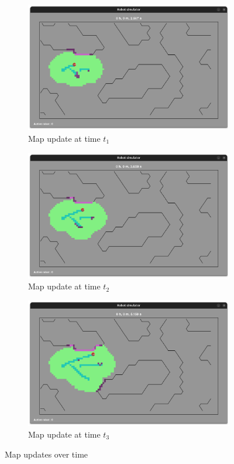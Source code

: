 \documentclass[../main.tex]{subfiles}
\begin{document}
\begin{figure}[H]
	\centering
	\begin{subfigure}{0.4\textwidth}
		\centering
		\includegraphics[width=\textwidth]{IMAGES/part2/lgm_t1.png}
		\caption{Map update at time $t_1$}
	\end{subfigure}
	\hfill
	\begin{subfigure}{0.4\textwidth}
		\centering
		\includegraphics[width=\textwidth]{IMAGES/part2/lgm_t2.png}
		\caption{Map update at time $t_2$}
	\end{subfigure}
	\vfill
	\begin{subfigure}{0.4\textwidth}
		\centering
		\includegraphics[width=\textwidth]{IMAGES/part2/lgm_t3.png}
		\caption{Map update at time $t_3$}
	\end{subfigure}
	\caption{Map updates over time}
	\label{fig:map_updates}
\end{figure}
\end{document}
